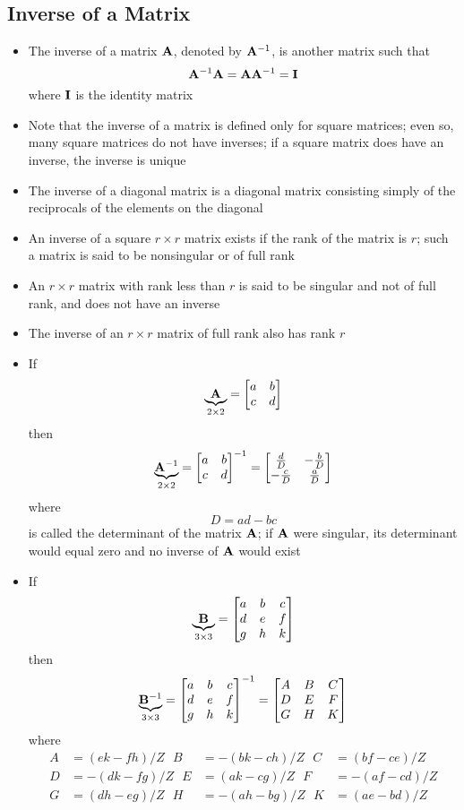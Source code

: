 \subsection{Inverse of a Matrix}
\begin{itemize}
\item The inverse of a matrix $\mathbf{A}$, denoted by $\mathbf{A}^{-1}$, is another matrix such that $$ \mathbf{A}^{-1}\mathbf{A} = \mathbf{A}\mathbf{A}^{-1} = \mathbf{I} $$ where $\mathbf{I}$ is the identity matrix 
\item Note that the inverse of a matrix is defined only for square matrices; even so, many square matrices do not have inverses; if a square matrix does have an inverse, the inverse is unique 
\item The inverse of a diagonal matrix is a diagonal matrix consisting simply of the reciprocals of the elements on the diagonal
\item An inverse of a square $r \times r$ matrix exists if the rank of the matrix is $r$; such a matrix is said to be nonsingular or of full rank
\item An $r \times r$ matrix with rank less than $r$ is said to be singular and not of full rank, and does not have an inverse
\item The inverse of an $r \times r$ matrix of full rank also has rank $r$ 
\item If $$ \underbrace{\mathbf{A}}_{2 \times 2} = \begin{bmatrix} a & b \\ c & d \end{bmatrix} $$ then $$ \underbrace{\mathbf{A}^{-1}}_{2 \times 2} = \begin{bmatrix} a & b \\ c & d \end{bmatrix}^{-1} = \begin{bmatrix}  \frac{d}{D} & -\frac{b}{D} \\ -\frac{c}{D} & \frac{a}{D} \end{bmatrix} $$ where $$ D = ad - bc $$ is called the determinant of the matrix $\mathbf{A}$; if $\mathbf{A}$ were singular, its determinant would equal zero and no inverse of $\mathbf{A}$ would exist
\item If $$ \underbrace{\mathbf{B}}_{3 \times 3} = \begin{bmatrix} a & b & c \\ d & e & f \\ g & h & k \end{bmatrix} $$ then $$ \underbrace{\mathbf{B}^{-1}}_{3 \times 3} = \begin{bmatrix} a & b & c \\ d & e & f \\ g & h & k \end{bmatrix}^{-1} = \begin{bmatrix} A & B & C \\ D & E & F \\ G & H & K \end{bmatrix} $$ where $$ \begin{aligned} A &= (ek - fh)/Z ~~~ B &= -(bk - ch)/Z ~~~ C &= (bf - ce)/Z \\ D &= -(dk - fg)/Z ~~~ E &= (ak - cg)/Z ~~~ F &= -(af - cd)/Z \\ G &= (dh - eg)/Z ~~~ H &= -(ah - bg)/Z ~~~ K &= (ae - bd)/Z \end{aligned} $$ 

\end{itemize}
